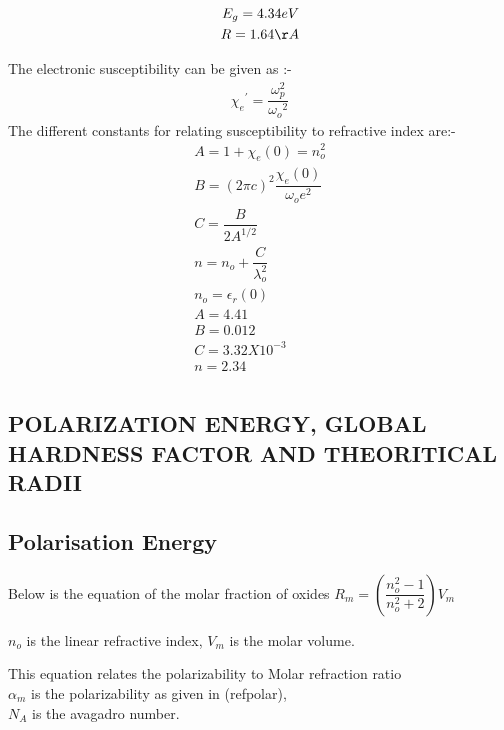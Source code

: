 \documentclass[journal]{IEEEtran}
\begin{document}
\begin{align}
E_g = 4.34 eV                                                       \\
R = 1.64 \AA                                                   \\                                    
\end{align}

The electronic susceptibility can be given as :-
\begin{align}
{\chi_e}^{'} = \dfrac{\omega_p^{2}}{{\omega_o}^{2}}
\end{align}
The different constants for relating susceptibility to refractive index are:-
\begin{align}
A = 1+ \chi_e(0) = n_o^{2} \\
B = (2 \pi c)^{2}\dfrac{\chi_e(0)}{\omega_oe^{2}} \\
C = \dfrac{B}{2 A^{1/2}} \\
n = n_o + \dfrac{C}{\lambda_o^{2}} \\
n_o = \epsilon_r(0) \\
A = 4.41 \\
B= 0.012 \\
C= 3.32 X 10^{-3} \\
n= 2.34  \\
\end{align}



\subsection{POLARIZATION ENERGY, GLOBAL HARDNESS FACTOR AND THEORITICAL RADII}

\subsection{Polarisation Energy}
Below is the equation of the molar fraction of oxides
$
R_m = (\dfrac{n^2_o -1}{n^2_o +2 })V_m $

$n_o$ is the linear refractive index, 
$V_m$ is the molar volume.

\hfill

This equation relates the polarizability to Molar refraction ratio\\
$\alpha_m$ is the polarizability as given in (ref{polar}), \\
$N_A$ is the avagadro number.\\
\end{document}
